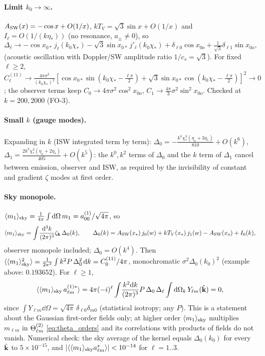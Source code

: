 \paragraph{Limit $k_0\to\infty$.}  $A_{\rm SW}(x)=-\cos x+O(1/x)$, $kT_V=\sqrt3\sin x+O(1/x)$ and $I_\ell=O(1/(k\eta_*))$ (no resonance,
$a_\pm\neq0$), so
\begin{equation}
\Delta_\ell\to-\cos x_{0*}\,j_\ell(k_0\chi_*)-\sqrt3\sin x_{0*}\,j'_\ell(k_0\chi_*)+\delta_{\ell0}\cos x_{0o}+\tfrac{1}{\sqrt3}\delta_{\ell1}\sin x_{0o},
\end{equation}
(acoustic oscillation with Doppler/SW amplitude ratio $1/c_s=\sqrt3$).  For fixed $\ell\ge2$, $C^{(11)}_\ell\to\frac{4\pi\sigma^2}{(k_0\chi_*)^2}
[\cos x_{0*}\sin(k_0\chi_*-\tfrac{\ell\pi}2)+\sqrt3\sin x_{0*}\cos(k_0\chi_*-\tfrac{\ell\pi}2)]^2\to0$; the observer terms keep
$C_0\to4\pi\sigma^2\cos^2x_{0o}$, $C_1\to\tfrac{4\pi}{3}\sigma^2\sin^2x_{0o}$.  Checked at $k=200,2000$ (FO-3).

\paragraph{Small $k$ (gauge modes).}  Expanding in $k$ (ISW integrated term by term):
$\Delta_0=-\frac{k^4\chi_*^3(\eta_o+3\eta_*)}{810}+O(k^6)$, $\Delta_1=\frac{2k^3\chi_*^2(\eta_o+2\eta_*)}{405}+O(k^5)$:
the $k^0,k^2$ terms of $\Delta_0$ and the $k$ term of $\Delta_1$ cancel between emission, observer and ISW, as required by the
invisibility of constant and gradient $\zeta$ modes at first order.

\paragraph{Sky monopole.}  $\langle m_1\rangle_{\rm sky}=\frac1{4\pi}\int\mathrm d\Omega\,m_1=a^{(1)}_{00}/\sqrt{4\pi}$, so
\begin{equation}
\langle m_1\rangle_{\rm sky}=\int\!\frac{\mathrm d^3k}{(2\pi)^3}\zeta_\mathbf k\,\Delta_0(k),\qquad
\Delta_0(k)=A_{\rm SW}(x_*)\,j_0(w)+kT_V(x_*)\,j_1(w)-A_{\rm SW}(x_o)+I_0(k),
\end{equation}
observer monopole included; $\Delta_0=O(k^4)$.  Then $\langle \langle m_1\rangle_{\rm sky}^2\rangle=\frac1{2\pi^2}\int k^2P\,\Delta_0^2\,\mathrm d k=C^{(11)}_0/4\pi$, monochromatic
$\sigma^2\Delta_0(k_0)^2$ (example above: $0.193652$).  For $\ell\ge1$,
\begin{equation}
\langle \langle m_1\rangle_{\rm sky}\,a^{(1)*}_{\ell m}\rangle=4\pi(-i)^\ell\int\!\frac{k^2\mathrm d k}{(2\pi)^3}P\,\Delta_0\,\Delta_\ell\int\mathrm d\Omega_k\,Y_{\ell m}(\hat{\mathbf k})=0,
\end{equation}
since $\int Y_{\ell m}\dd\Omega=\sqrt{4\pi}\,\delta_{\ell0}\delta_{m0}$ (statistical isotropy; any $P$).  This is a statement about the
Gaussian first-order fields only; at higher order $\langle m_1\rangle_{\rm sky}$ multiplies $m_{\ell m}$ in $\Theta^{(2)}_{\ell m}$ \eqref{eq:theta_orders} and its
correlations with products of fields do not vanish.  Numerical check: the sky average of the kernel equals $\Delta_0(k_0)$ for every
$\hat{\mathbf k}$ to $5\times10^{-15}$, and $|\langle \langle m_1\rangle_{\rm sky}a^*_{\ell m}\rangle|<10^{-14}$ for $\ell=1..3$.
